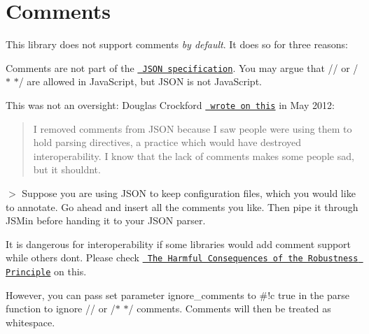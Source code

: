 \chapter{Comments}
\hypertarget{md_build_2dt__core_2__deps_2nlohmann__json-src_2docs_2mkdocs_2docs_2features_2comments}{}\label{md_build_2dt__core_2__deps_2nlohmann__json-src_2docs_2mkdocs_2docs_2features_2comments}
\label{md_build_2dt__core_2__deps_2nlohmann__json-src_2docs_2mkdocs_2docs_2features_2comments_autotoc_md1351}%
%
 This library does not support comments {\itshape by default}. It does so for three reasons\+:


\begin{DoxyEnumerate}
\item Comments are not part of the \href{https://tools.ietf.org/html/rfc8259}{\texttt{ JSON specification}}. You may argue that {\ttfamily //} or {\ttfamily /\texorpdfstring{$\ast$}{*} \texorpdfstring{$\ast$}{*}/} are allowed in Java\+Script, but JSON is not Java\+Script.
\item This was not an oversight\+: Douglas Crockford \href{https://plus.google.com/118095276221607585885/posts/RK8qyGVaGSr}{\texttt{ wrote on this}} in May 2012\+:
\end{DoxyEnumerate}

\begin{quote}
 I removed comments from JSON because I saw people were using them to hold parsing directives, a practice which would have destroyed interoperability. I know that the lack of comments makes some people sad, but it shouldn\textquotesingle{}t. \end{quote}
\texorpdfstring{$>$}{>} Suppose you are using JSON to keep configuration files, which you would like to annotate. Go ahead and insert all the comments you like. Then pipe it through JSMin before handing it to your JSON parser.


\begin{DoxyEnumerate}
\item It is dangerous for interoperability if some libraries would add comment support while others don\textquotesingle{}t. Please check \href{https://tools.ietf.org/html/draft-iab-protocol-maintenance-01}{\texttt{ The Harmful Consequences of the Robustness Principle}} on this.
\end{DoxyEnumerate}

However, you can pass set parameter {\ttfamily ignore\+\_\+comments} to {\ttfamily \#!c true} in the parse function to ignore {\ttfamily //} or {\ttfamily /\texorpdfstring{$\ast$}{*} \texorpdfstring{$\ast$}{*}/} comments. Comments will then be treated as whitespace.

